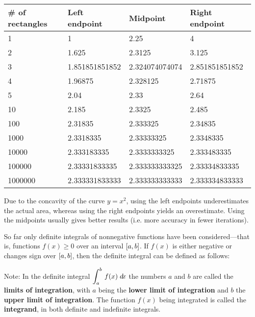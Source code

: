 \begin{center}
\texttt\small{
 \begin{tabular}{|l|l|l|l|}
  \hline
  \rowcolor{fillcolor} \# of rectangles & Left endpoint & Midpoint & Right endpoint\\
  \hline
  1 & 1 & 2.25 & 4\\
  \hline
  2 & 1.625 & 2.3125 & 3.125\\
  \hline
  3 & 1.851851851852 & 2.324074074074 & 2.851851851852\\
  \hline
  4 & 1.96875 & 2.328125 & 2.71875\\
  \hline
  5 & 2.04 & 2.33 & 2.64\\
  \hline
  10 & 2.185 & 2.3325 & 2.485\\
  \hline
  100 & 2.31835 & 2.333325 & 2.34835\\
  \hline
  1000 & 2.3318335 & 2.33333325 & 2.3348335\\
  \hline
  10000 & 2.333183335 & 2.3333333325 & 2.333483335\\
  \hline
  100000 & 2.33331833335 & 2.333333333325 & 2.33334833335\\
  \hline
  1000000 & 2.333331833333 & 2.333333333333 & 2.333334833333\\
  \hline
 \end{tabular}}
\end{center}\vspace{-2mm}

Due to the concavity of the curve $y=x^2$, using the left endpoints
underestimates the actual area, whereas using the right endpoints yields an
overestimate. Using the midpoints usually gives better results (i.e. more
accuracy in fewer iterations).

So far only definite integrals of nonnegative functions have been
considered---that is, functions $f(x) \ge 0$ over an interval $\lbrack a,b \rbrack$. If
$f(x)$ is either negative or changes sign over $\lbrack a,b \rbrack$, then the definite
integral can be defined as follows:

\newpage
\noindent Note: In the definite integral $\displaystyle\int_a^b\,f(x)\;d\!x$
the numbers $a$ and $b$ are called the
\textbf{limits of integration}, with $a$ being the
\textbf{lower limit of integration} and $b$ the \textbf{upper limit of
integration}. The function $f(x)$ being integrated is called the
\textbf{integrand}, in both definite and indefinite
integrals.\vspace{2mm}

